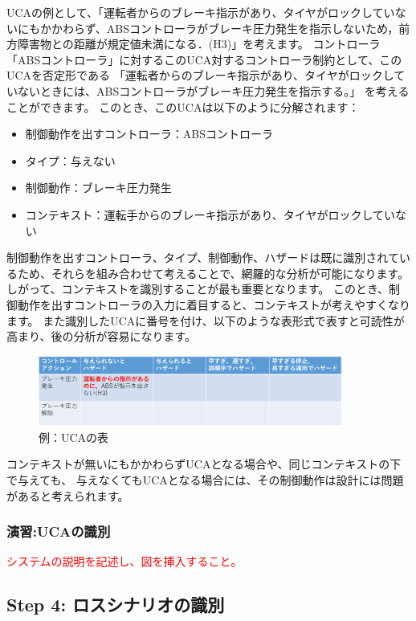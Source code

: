 UCAの例として、「運転者からのブレーキ指示があり、タイヤがロックしていないにもかかわらず、ABSコントローラがブレーキ圧力発生を指示しないため，前方障害物との距離が規定値未満になる．(H3)」を考えます。
コントローラ「ABSコントローラ」に対するこのUCA対するコントローラ制約として、このUCAを否定形である
「運転者からのブレーキ指示があり、タイヤがロックしていないときには、ABSコントローラがブレーキ圧力発生を指示する。」
を考えることができます。
このとき、このUCAは以下のように分解されます：
%
\begin{itemize}
    \item 制御動作を出すコントローラ：ABSコントローラ
    \item タイプ：与えない
    \item 制御動作：ブレーキ圧力発生
    \item コンテキスト：運転手からのブレーキ指示があり、タイヤがロックしていない
\end{itemize}
%
制御動作を出すコントローラ、タイプ、制御動作、ハザードは既に識別されているため、それらを組み合わせて考えることで、網羅的な分析が可能になります。
しがって、コンテキストを識別することが最も重要となります。
このとき、制御動作を出すコントローラの入力に着目すると、コンテキストが考えやすくなります。
また識別したUCAに番号を付け、以下のような表形式で表すと可読性が高まり、後の分析が容易になります。
%
\begin{figure}[H]
    \centering
    \includegraphics[width=100mm]{safety_assurance_contents/ch3images/fig-3-2-3-03.png}
    \caption[short]{例：UCAの表}
\end{figure}

コンテキストが無いにもかかわらずUCAとなる場合や、同じコンテキストの下で与えても、
与えなくてもUCAとなる場合には、その制御動作は設計には問題があると考えられます。

\subsubsection{演習:UCAの識別} %

\textcolor{red}{システムの説明を記述し、図を挿入すること。}

\subsection{Step 4: ロスシナリオの識別}

